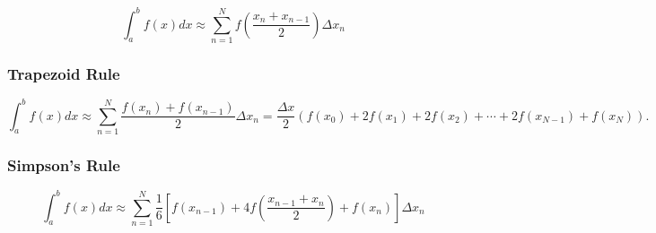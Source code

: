 \documentclass[reqno]{amsart}
\theoremstyle{definition}
\begin{document}
\begin{equation}
\int_a^b f(x)dx \approx \sum_{n=1}^N f(\frac{x_n+x_{n-1}}{2})\Delta x_n
\end{equation}

\subsubsection*{Trapezoid Rule}

\begin{equation}
\int_a^b f(x)dx \approx \sum_{n=1}^N \frac{f(x_n)+f(x_{n-1})}{2}\Delta x_n = \frac{\Delta x}{2}\left(f(x_0) + 2f(x_1) + 2f(x_2) + \cdots + 2f(x_{N-1}) + f(x_N)\right).
\end{equation}

\subsubsection*{Simpson's Rule}

\begin{equation*}
\int_a^b f(x)dx \approx \sum_{n=1}^N \frac{1}{6}\left[f(x_{n-1}) + 4f\left(\frac{x_{n-1}+x_n}{2}\right) + f(x_n)\right]\Delta x_n
\end{equation*}
\end{document}
